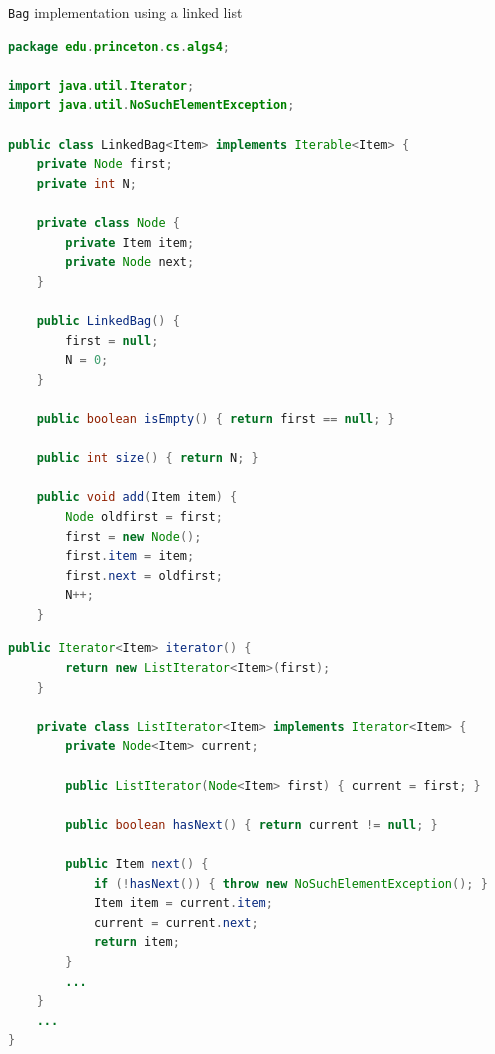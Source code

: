 \documentclass[8pt,a4paper,compress]{beamer}
\begin{document}
\begin{frame}[fragile]
\lstinline{Bag} implementation using a linked list
\begin{lstlisting}[language=Java]
package edu.princeton.cs.algs4;

import java.util.Iterator;
import java.util.NoSuchElementException;

public class LinkedBag<Item> implements Iterable<Item> {
    private Node first;
    private int N;

    private class Node {
        private Item item;
        private Node next;
    }

    public LinkedBag() {
        first = null;
        N = 0;
    }

    public boolean isEmpty() { return first == null; }

    public int size() { return N; }

    public void add(Item item) {
        Node oldfirst = first;
        first = new Node();
        first.item = item;
        first.next = oldfirst;
        N++;
    }
\end{lstlisting}
\end{frame}

\begin{frame}[fragile]
\begin{lstlisting}[language=Java]
    public Iterator<Item> iterator() { 
        return new ListIterator<Item>(first); 
    }

    private class ListIterator<Item> implements Iterator<Item> {
        private Node<Item> current;

        public ListIterator(Node<Item> first) { current = first; }

        public boolean hasNext() { return current != null; }

        public Item next() {
            if (!hasNext()) { throw new NoSuchElementException(); }
            Item item = current.item;
            current = current.next; 
            return item;
        }
        ...
    }
    ...
}
\end{lstlisting}
\end{frame}
\end{document}
